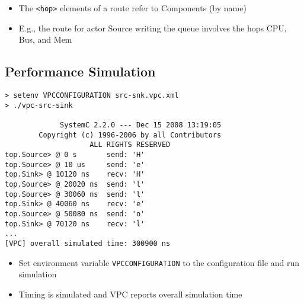 \begin{frame}[t]
\begin{figure}
\centering
\resizebox{0.7\columnwidth}{!}{}
\end{figure}

\begin{itemize}
\item The \lstinline!<hop>! elements of a route refer to Components (by name)
\item E.g., the route for actor Source writing the queue involves the hops CPU, Bus, and Mem
\end{itemize}

\end{frame}




\subsection{Performance Simulation}


\begin{frame}[fragile=singleslide]
\begin{lstlisting}
> setenv VPCCONFIGURATION src-snk.vpc.xml
> ./vpc-src-sink

             SystemC 2.2.0 --- Dec 15 2008 13:19:05
        Copyright (c) 1996-2006 by all Contributors
                    ALL RIGHTS RESERVED            
top.Source> @ 0 s       send: 'H'
top.Source> @ 10 us     send: 'e'
top.Sink> @ 10120 ns    recv: 'H'
top.Source> @ 20020 ns  send: 'l'
top.Source> @ 30060 ns  send: 'l'
top.Sink> @ 40060 ns    recv: 'e'
top.Source> @ 50080 ns  send: 'o'
top.Sink> @ 70120 ns    recv: 'l'
...
[VPC] overall simulated time: 300900 ns
\end{lstlisting}
\begin{itemize}
\item Set environment variable \lstinline!VPCCONFIGURATION! to the configuration file and run simulation
\item Timing is simulated and VPC reports overall simulation time 
\end{itemize}
\end{frame}


